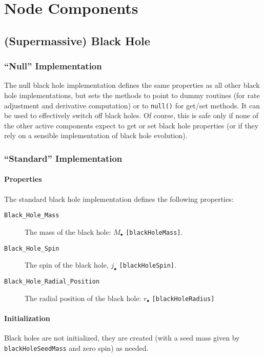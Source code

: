 \chapter{Node Components}

\section{(Supermassive) Black Hole}

\subsection{``Null'' Implementation}

The null black hole implementation defines the same properties as all other black hole implementations, but sets the methods to point to dummy routines (for rate adjustment and derivative computation) or to {\tt null()} for get/set methods. It can be used to effectively switch off black holes. Of course, this is safe only if none of the other active components expect to get or set black hole properties (or if they rely on a sensible implementation of black hole evolution).

\subsection{``Standard'' Implementation}

\subsubsection{Properties}

The standard black hole implementation defines the following properties:
\begin{description}
 \item [{\tt Black\_Hole\_Mass}] The mass of the black hole: $M_\bullet$ {\tt [blackHoleMass]}.
 \item [{\tt Black\_Hole\_Spin}] The spin of the black hole, $j_\bullet$ {\tt [blackHoleSpin]}.
 \item [{\tt Black\_Hole\_Radial\_Position}] The radial position of the black hole: $r_\bullet$ {\tt [blackHoleRadius]} 
\end{description}

\subsubsection{Initialization}

Black holes are not initialized, they are created (with a seed mass given by {\tt blackHoleSeedMass} and zero spin) as needed.

